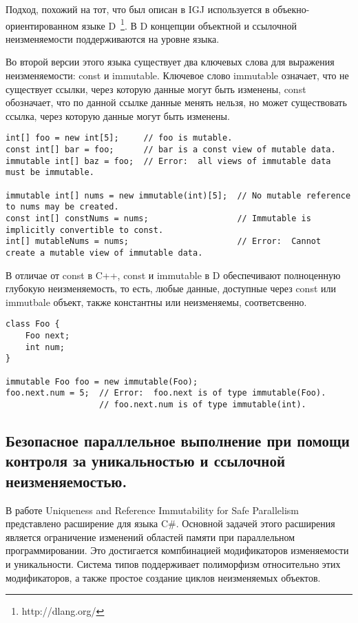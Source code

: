 Подход, похожий на тот, что был описан в IGJ используется в объекно-ориентированном языке D~\footnote{http://dlang.org/}. В D концепции объектной и ссылочной неизменяемости поддерживаются на уровне языка.

Во второй версии этого языка существует два ключевых слова для выражения неизменяемости: const и immutable. Ключевое слово immutable означает, что не существует ссылки, через которую данные могут быть изменены, const обозначает, что по данной ссылке данные менять нельзя, но может существовать ссылка, через которую данные могут быть изменены. 

\begin{lstlisting}[caption=const vs immutable, label=code:d_const_vs_immutable]
int[] foo = new int[5];     // foo is mutable.
const int[] bar = foo;      // bar is a const view of mutable data.
immutable int[] baz = foo;  // Error:  all views of immutable data must be immutable.
 
immutable int[] nums = new immutable(int)[5];  // No mutable reference to nums may be created.
const int[] constNums = nums;                  // Immutable is implicitly convertible to const.
int[] mutableNums = nums;                      // Error:  Cannot create a mutable view of immutable data.
\end{lstlisting}

В отличае от const в C++, const и immutable в D обеспечивают полноценную глубокую неизменяемость, то есть, любые данные, доступные через const или immutbale объект, также константны или неизменяемы, соответсвенно.

\begin{lstlisting}[caption=const vs immutable, label=code:d_const_vs_immutable]
class Foo {
    Foo next;
    int num;
}
 
immutable Foo foo = new immutable(Foo);
foo.next.num = 5;  // Error:  foo.next is of type immutable(Foo).
                   // foo.next.num is of type immutable(int).
\end{lstlisting}

\subsection{Безопасное параллельное выполнение при помощи контроля за уникальностью и ссылочной неизменяемостью.}

В работе Uniqueness and Reference Immutability for Safe Parallelism \cite{Gordon2012} представлено расширение для языка C\#. Основной задачей этого расширения является ограничение изменений областей памяти при параллельном программировании. Это достигается компбинацией модификаторов изменяемости и уникальности. Система типов поддерживает полиморфизм относительно этих модификаторов, а также простое создание циклов неизменяемых объектов.

